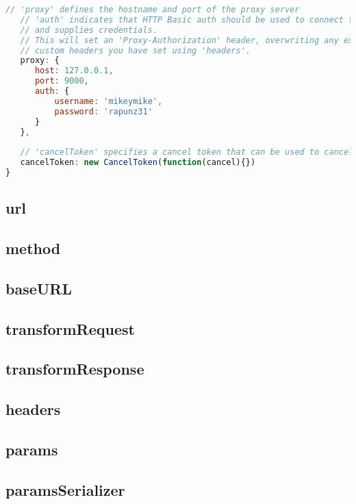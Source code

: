 \begin{lstlisting}[language=JavaScript]
   // 'proxy' defines the hostname and port of the proxy server
   // 'auth' indicates that HTTP Basic auth should be used to connect to the proxy, 
   // and supplies credentials.
   // This will set an 'Proxy-Authorization' header, overwriting any existing 'Proxy-Authorization' 
   // custom headers you have set using 'headers'.
   proxy: {
      host: 127.0.0.1,
      port: 9000,
      auth: {
          username: 'mikeymike',
          password: 'rapunz31'
      }
   },
   
   // 'cancelToken' specifies a cancel token that can be used to cancel the request
   cancelToken: new CancelToken(function(cancel){})
}
\end{lstlisting}

\subsection{url}


\subsection{method}


\subsection{baseURL}


\subsection{transformRequest}


\subsection{transformResponse}



\subsection{headers}



\subsection{params}


\subsection{paramsSerializer}


